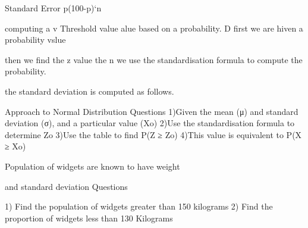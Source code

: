 Standard Error p(100-p)`n





computing a v
Threshold value
alue based on a probability.
D
first we are hiven a probability vslue

then we find the z value
the 
n we use the standardisation formula to compute the probability.



the standard deviation is computed as follows.




 

Approach to Normal Distribution Questions
1)Given the mean (μ) and standard deviation (σ), and a particular value (Xo)
2)Use the standardisation formula to determine Zo
3)Use the table to find P(Z ≥ Zo)
4)This value is equivalent to P(X ≥ Xo)
 
Population of widgets are known to have weight
 
and standard deviation
 Questions
 
1) Find the population of widgets greater than 150 kilograms
2) Find the proportion of widgets less than 130 Kilograms

